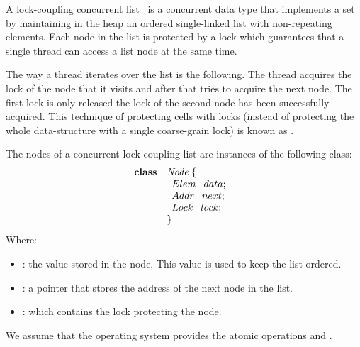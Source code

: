\begin{defn}
A lock-coupling concurrent list~\cite{herlihy08art,vafeiadis06proving} is 
a concurrent data type that implements a set by maintaining in the heap an 
ordered single-linked list with non-repeating elements.
%
Each node in the list is protected by a lock which guarantees that a 
single thread can access a list node at the same time.
%
\end{defn}

The way a thread iterates over the list is the following.
%
The thread acquires the lock of the node
that it visits and after that tries to acquire the next node.
The first lock is only released the lock of the
second node has been successfully acquired.
%
This technique of protecting cells with locks (instead of protecting
the whole data-structure with a single coarse-grain lock) is known as
.


The nodes of a concurrent lock-coupling list are instances of the following 
\ListNode class:
%
\[
  \begin{array}{ll}
	  \textbf{class} & \mathit{Node}  \;\{\\
	  		&\begin{array}{l}
				Elem \:\;\; data; \;\\
				Addr \:\;\; next; \;\\
				Lock \:\;\; lock; \;
			\end{array}\\
		&\}
  \end{array}
\]
%
Where:
\begin{itemize}
		\item \fData: the value stored in the node, This value is used to keep 
			the list ordered.
		\item \fNext: a pointer that stores the address of the next node in 
			the list.
		\item \fLock: which contains the lock protecting the node.
\end{itemize}

We assume that the operating system provides the atomic operations \fLock 
and \fUnlock. 

